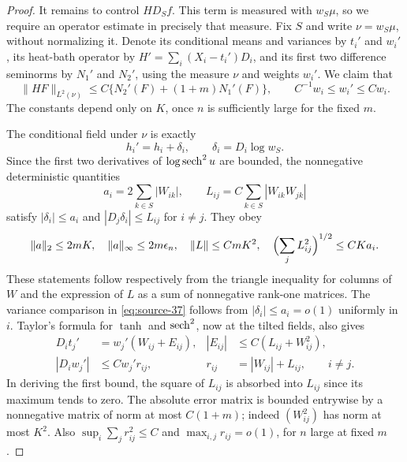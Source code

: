 \begin{proof}
It remains to control $HD_Sf$.  This term is measured with $w_S\mu$,
so we require an operator estimate in precisely that measure.  Fix $S$
and write $\nu=w_S\mu$, without normalizing it.  Denote its conditional
means and variances by $t_i'$ and $w_i'$, its heat-bath operator by
$H'=\sum_i(X_i-t_i')D_i$, and its first two difference seminorms by
$N_1'$ and $N_2'$, using the measure $\nu$ and weights $w_i'$.
We claim that
\begin{equation}
 \|HF\|_{L^2(\nu)}
 \le C\{N_2'(F)+(1+m)N_1'(F)\},
 \qquad C^{-1}w_i\le w_i'\le Cw_i.
 \label{eq:source-37}
\end{equation}
The constants depend only on $K$, once $n$ is sufficiently large for the
fixed $m$.

The conditional field under $\nu$ is exactly
\[
 h_i'=h_i+\delta_i,\qquad \delta_i=D_i\log w_S.
\]
Since the first two derivatives of $\log\operatorname{sech}^2u$ are bounded, the
nonnegative deterministic quantities
\[
 a_i=2\sum_{k\in S}|W_{ik}|,
 \qquad L_{ij}=C\sum_{k\in S}|W_{ik}W_{jk}|
\]
satisfy $|\delta_i|\le a_i$ and $|D_j\delta_i|\le L_{ij}$ for $i\ne j$.
They obey
\[
 \|a\|_2\le 2mK,\quad \|a\|_\infty\le2m\epsilon_n,
 \quad \|L\|\le CmK^2,
 \quad \Bigl(\sum_jL_{ij}^2\Bigr)^{1/2}\le CK a_i.
\]
These statements follow respectively from the triangle inequality for
columns of $W$ and the expression of $L$ as a sum of nonnegative
rank-one matrices.  The variance comparison in \eqref{eq:source-37}
follows from $|\delta_i|\le a_i=o(1)$ uniformly in $i$.  Taylor's formula
for $\tanh$ and $\operatorname{sech}^2$, now at the tilted fields, also gives
\begin{align}
 D_i t_j'&=w_j'(W_{ij}+E_{ij}),
 &|E_{ij}|&\le C(L_{ij}+W_{ij}^2),\label{eq:micro-tilted-coefficients}\\
 |D_iw_j'|&\le Cw_j' r_{ij},
 &r_{ij}&=|W_{ij}|+L_{ij},\qquad i\ne j.\nonumber
\end{align}
In deriving the first bound, the square of $L_{ij}$ is absorbed into
$L_{ij}$ since its maximum tends to zero.  The absolute error matrix is
bounded entrywise by a nonnegative matrix of norm at most $C(1+m)$;
indeed $(W_{ij}^2)$ has norm at most $K^2$.  Also
$\sup_i\sum_jr_{ij}^2\le C$ and $\max_{i,j}r_{ij}=o(1)$, for $n$ large
at fixed $m$.


\end{proof}
